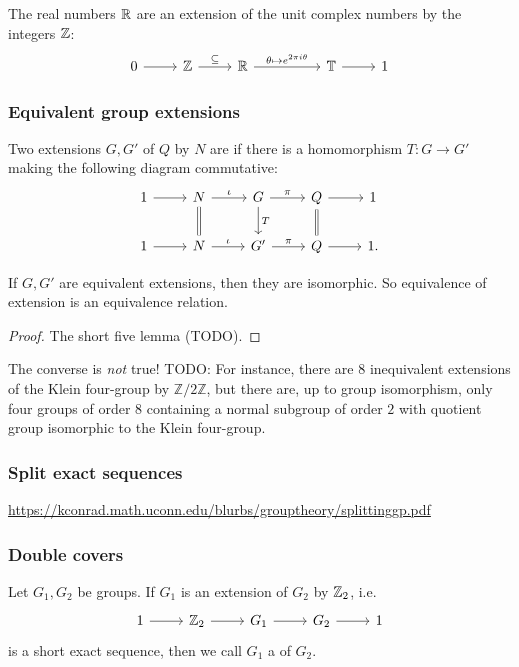 \begin{example}
The real numbers $\mathbb{R}$ are an extension of the unit complex numbers by the integers $\mathbb{Z}$:
\[ \begin{tikzcd}
0 \rar & \Z \rar{\subseteq} & \R \ar[rr, "\theta\mapsto e^{2\pi i \theta}"] && \T \rar & 1
\end{tikzcd} \]
\end{example}

\subsubsection{Equivalent group extensions}
\begin{definition}
Two extensions $G,G'$ of $Q$ by $N$ are  if there is a homomorphism $T:G\to G'$ making the following diagram commutative:
\[
\begin{tikzcd}
1 \ar[r] & N \ar[r, "\iota"] \ar[equal]{d} & G \ar[r, "\pi"] \ar[d,"T"] & Q \ar[r] \ar[d, equal] & 1 \\
1 \ar[r] & N \ar[r, "\iota"] & G' \ar[r, "\pi"] & Q \ar[r] & 1.
\end{tikzcd}
\]
\end{definition}
\begin{lemma}
If $G,G'$ are equivalent extensions, then they are isomorphic. So equivalence of extension is an equivalence relation.
\end{lemma}
\begin{proof}
The short five lemma (TODO).
\end{proof}
The converse is \emph{not} true! TODO: For instance, there are $8$ inequivalent extensions of the Klein four-group by $\mathbb{Z}/2\mathbb{Z}$, but there are, up to group isomorphism, only four groups of order $8$ containing a normal subgroup of order $2$ with quotient group isomorphic to the Klein four-group.

\subsubsection{Split exact sequences}
\url{https://kconrad.math.uconn.edu/blurbs/grouptheory/splittinggp.pdf}

\subsubsection{Double covers}
\begin{definition}
Let $G_1, G_2$ be groups. If $G_1$ is an extension of $G_2$ by $\mathbb{Z}_2$, i.e.\
\[\begin{tikzcd}
1 \rar & \Z_2 \rar & G_1 \rar & G_2 \rar & 1
\end{tikzcd} \]
is a short exact sequence, then we call $G_1$ a  of $G_2$.
\end{definition}

